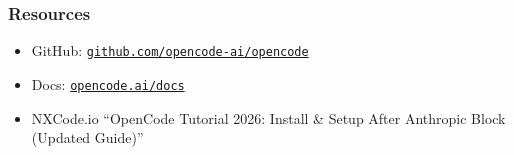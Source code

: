 \begin{frame}[fragile]\frametitle{ Resources}
  \begin{itemize}
	\item GitHub: \href{https://github.com/opencode-ai/opencode}{\texttt{github.com/opencode-ai/opencode}}
	\item Docs: \href{https://opencode.ai/docs}{\texttt{opencode.ai/docs}}
	\item NXCode.io ``OpenCode Tutorial 2026: Install \& Setup After Anthropic Block (Updated Guide)''
  \end{itemize}
\end{frame}
